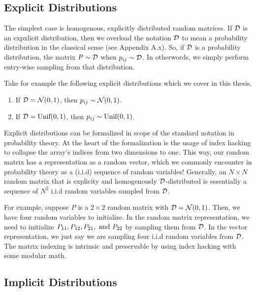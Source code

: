 \subsection{Explicit Distributions}

The simplest case is homogenous, explicitly distributed random matrices. If $\mathcal{D}$ is an expxlicit distribution, then we overload the notation $\mathcal{D}$ to mean a probability distribution in the classical sense (see Appendix A.x). So, if $\mathcal{D}$ is a probability distribution, the matrix $P \sim \mathcal{D}$ when $p_{ij} \sim \mathcal{D}$. In otherwords, we simply perform entry-wise sampling from that distribution.

Take for example the following explicit distributions which we cover in this thesis.

\begin{enumerate}
\item  If $\mathcal{D} = \mathcal{N}(0,1)$, then $p_{ij} \sim \mathcal{N}(0,1)$.
\item  If $\mathcal{D} = \text{Unif}(0,1)$, then $p_{ij} \sim \text{Unif}(0,1)$.
\end{enumerate}

\begin{remark}[Formalization]
Explicit distributions can be formalized in scope of the standard notation in probability theory. At the heart of the formalization is the usage of index hacking to collapse the array's indices from two dimensions to one. This way, our random matrix has a representation as a random vector, which we commonly encounter in probability theory as a (i.i.d) sequence of random variables! Generally, an $N \times N$ random matrix that is explicity and homogenously $\mathcal{D}$-distributed is essentially a sequence of $N^2$ i.i.d random variables sampled from $\mathcal{D}$.
\end{remark}

\begin{example}[Formalization]
For example, suppose $P$ is a $2 \times 2$ random matrix with $\mathcal{D} = \mathcal{N}(0,1)$. Then, we have four random variables to initialize. In the random matrix representation, we need to initialize $P_{11}, P_{12}, P_{21}, \text{ and } P_{22}$ by sampling them from $\mathcal{D}$. In the vector representation, we just say we are sampling four i.i.d random variables from $\mathcal{D}$. The matrix indexing is intrinsic and preservable by using index hacking with some modular math.
\end{example}

\subsection{Implicit Distributions}

